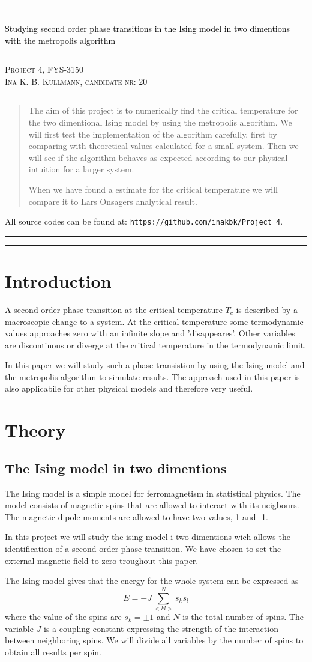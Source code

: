 \documentclass[11pt,a4wide]{article}
\newcommand*{\titleAT}{\begingroup %
\newlength{\drop} %
\drop=0.1\textheight %

\rule{\textwidth}{1pt}\par %
\vspace{2pt}\vspace{-\baselineskip} %
\rule{\textwidth}{0.4pt}\par %

\vspace{0.5\drop} %
\centering %
\textcolor{black}{ %
{\Huge Studying second order phase transitions in the Ising model in two dimentions with the metropolis algorithm}\\[0.75\baselineskip] %
} 

\vspace{0.25\drop} %
\rule{0.3\textwidth}{0.4pt}\par %
\vspace{0.25\drop} %

{\Large \textsc{Project 4, FYS-3150\\[0.75\baselineskip] \normalsize{Ina K. B. Kullmann, candidate nr: 20}
}}\par %


\vspace{0.25\drop} %
\rule{0.3\textwidth}{0.4pt}\par %
\vspace{0.25\drop} %

\begin{abstract}
The aim of this project is to numerically find the critical temperature for the two dimentional Ising model by using the metropolis algorithm. We will first test the implementation of the algorithm carefully, first by comparing with theoretical values calculated for a small system. Then we will see if the algorithm behaves as expected according to our physical intuition for a larger system.

When we have found a estimate for the critical temperature we will compare it to Lars Onsagers analytical result.

\end{abstract}
\vspace*{0.25\drop} %

\begin{center}
{ \scriptsize \noindent All source codes can be found at: \texttt{https://github.com/inakbk/Project\_4}. }
\end{center}

\rule{\textwidth}{0.4pt}\par %
\vspace{2pt}\vspace{-\baselineskip} %
\rule{\textwidth}{1pt}\par %

\endgroup}
\begin{document}
\titleAT %


\newpage
\tableofcontents
\newpage

\section{Introduction}
A second order phase transition at the critical temperature $T_c$ is described by a macroscopic change to a system. At the critical temperature some termodynamic values approaches zero with an infinite slope and 'disappeares'. Other variables are discontinous or diverge at the critical temperature in the termodynamic limit. 

In this paper we will study such a phase transistion by using the Ising model and the metropolis algorithm to simulate results. The approach used in this paper is also applicabile for other physical models and therefore very useful.

\section{Theory}

\subsection{The Ising model in two dimentions}
The Ising model is a simple model for ferromagnetism in statistical physics. The model consists of magnetic spins that are allowed to interact with its neigbours. The magnetic dipole moments are allowed to have two values, 1 and -1.

In this project we will study the ising model i two dimentions wich allows the identification of a second order phase transition. We have chosen to set the external magnetic field to zero troughout this paper.

The Ising model gives that the energy for the whole system can be expressed as
\begin{equation}
  E=-J\sum_{<kl>}^{N}s_ks_l
\end{equation}
where the value of the spins are  $s_k=\pm 1$ and $N$ is the total number of spins. The variable $J$ is a coupling constant expressing the strength of the interaction between neighboring spins. We will divide all variables by the number of spins to obtain all results per spin. 
\end{document}
